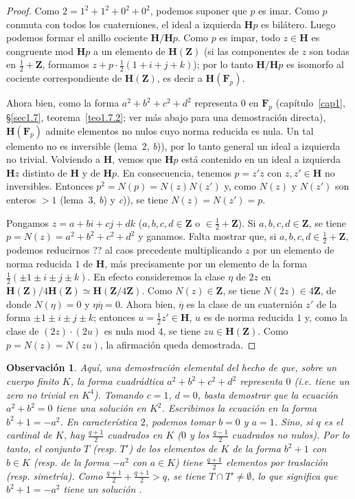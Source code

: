 \documentclass[oneside,bibtotoc,leqno,spanish]{amsbook}
\newcommand{\ZZ}{\mathbf{Z}}
\newcommand{\FF}{\mathbf{F}}
\newcommand{\HH}{\mathbf{H}}
\newcommand{\QED}{}%
\newcommand{\oline}[1]{\overline{#1}}
\numberwithin{equation}{section}
\theoremstyle{defi}
\theoremstyle{note}
\theoremstyle{rem}
\newtheorem*{remark*}{Observaci\'on}
\numberwithin{theorem}{section}
\numberwithin{proposition}{section}
\numberwithin{definition}{section}
\numberwithin{lemma}{section}
\numberwithin{corollary}{section}
\numberwithin{example}{section}
\numberwithin{footnote}{section}%
\begin{document}
\begin{proof}
Como $2 = 1^{2}+1^{2}+0^{2}+0^{2}$, podemos suponer que $p$ es imar. Como $p$ conmuta con todos los
cuaterniones, el ideal a izquierda $\HH p$ es bil\'atero. Luego podemos formar el anillo cociente
$\HH/\HH p$. Como $p$ es impar, todo $z\in\HH$ es congruente mod $\HH p$ a un elemento de $\HH(\ZZ)$
(si las componentes de $z$ son todas en $\frac{1}{2}+\ZZ$, formamos $z+p\cdot\frac{1}{2}(1+i+j+k)$);
por lo tanto $\HH/\HH p$ es isomorfo al cociente correspondiente de $\HH(\ZZ)$, es decir a $\HH(\FF_{p})$.

Ahora bien, como la forma $a^{2}+b^{2}+c^{2}+d^{2}$ representa $0$ en $\FF_{p}$ (cap\'itulo~\ref{cap1},
\S\ref{sec1.7}, teorema~\ref{teo1.7.2};
ver m\'as abajo para una demostraci\'on directa), $\HH(\FF_{p})$ admite elementos
no nulos cuyo norma reducida es nula. Un tal elemento no es inversible (lema~2, {\itshape b})), por lo
tanto general un ideal a izquierda no trivial. Volviendo a $\HH$, vemos que $\HH p$ est\'a
contenido en un ideal a izquierda $\HH z$ distinto de $\HH$ y de $\HH p$. En consecuencia, tenemos
$p = z'z$ con $z,z'\in\HH$ no inversibles. Entonces $p^{2}=N(p)=N(z)N(z')$ y, como
$N(z)$ y $N(z')$ son enteros $>1$ (lema~3, {\itshape b}) y {\itshape c})), se tiene $N(z) = N(z') = p$.

Pongamos $z = a+bi+cj+dk$ ($a,b,c,d\in\ZZ$ o $\in\frac{1}{2}+\ZZ$). Si $a,b,c,d\in\ZZ$, se tiene
$p = N(z) = a^{2}+b^{2}+c^{2}+d^{2}$ y ganamos. Falta mostrar que, si $a,b,c,d\in\frac{1}{2}+\ZZ$, podemos
reducirnos ?? al caos precedente multiplicando $z$ por un elemento de norma reducida $1$ de $\HH$, m\'as
precisamente por un elemento de la forma $\frac{1}{2}(\pm 1\pm i\pm j\pm k)$. En efecto consideremos
la clase $\eta$ de $2z$ en $\HH(\ZZ)/4\HH(\ZZ)\simeq\HH(\ZZ/4\ZZ)$. Como $N(z)\in\ZZ$, se tiene
$N(2z)\in 4\ZZ$, de donde $N(\eta) = 0$ y $\eta\oline\eta = 0$. Ahora bien, $\oline\eta$ es la clase
de un cuaterni\'on $z'$ de la forma $\pm 1\pm i\pm j\pm k$; entonces $u = \frac{1}{2}z'\in\HH$,
$u$ es de norma reducida $1$ y, como la clase de $(2z)\cdot(2u)$ es nula mod $4$, se tiene $zu\in\HH(\ZZ)$.
Como $p=N(z)=N(zu)$, la afirmaci\'on queda demostrada. \QED
\end{proof}

\begin{remark*}
Aqu\'i, una demostraci\'on elemental del hecho de que, sobre un cuerpo finito $K$, la forma cuadr\'adtica
$a^{2}+b^{2}+c^{2}+d^{2}$ {\em representa} $0$ (i.e. tiene un zero no trivial en $K^{4}$). Tomando
$c=1$, $d=0$, basta demostrar que la ecuaci\'on $a^{2}+b^{2}=0$ tiene una soluci\'on en $K^{2}$. Escribimos
la ecuaci\'on en la forma $b^{2}+1=-a^{2}$. En caracter\'istica $2$, podemos tomar $b=0$ y $a=1$.
Sino, si $q$ es el cardinal de $K$, hay $\frac{q+1}{2}$ cuadrados en $K$
($0$ y los $\frac{q-1}{2}$ cuadrados no nulos). Por lo tanto, el conjunto $T$ (resp. $T'$) de los elementos
de $K$ de la forma $b^{2}+1$ con $b\in K$ (resp. de la forma $-a^{2}$ con $a\in K$) tiene
$\frac{q+1}{2}$ elementos por traslaci\'on (resp. simetr\'ia). Como $\frac{q+1}{2}+\frac{q+1}{2}>q$,
se tiene $T\cap T'\neq\emptyset$, lo que significa que $b^{2}+1=-a^{2}$ tiene un soluci\'on \QED.
\end{remark*}
\end{document}
